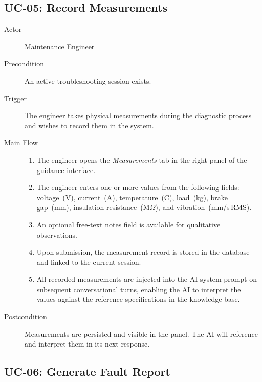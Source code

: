 \subsection{UC-05: Record Measurements\label{sec:uc05}}

\begin{description}
    \item[Actor] Maintenance Engineer
    \item[Precondition] An active troubleshooting session exists.
    \item[Trigger] The engineer takes physical measurements during the diagnostic process
                   and wishes to record them in the system.
    \item[Main Flow]
        \begin{enumerate}[noitemsep]
            \item The engineer opens the \textit{Measurements} tab in the right panel
                  of the guidance interface.
            \item The engineer enters one or more values from the following fields:
                  voltage~(V), current~(A), temperature~(\degree C), load~(kg),
                  brake gap~(mm), insulation resistance~(M\(\Omega\)), and vibration~(mm/s\,RMS).
            \item An optional free-text notes field is available for qualitative observations.
            \item Upon submission, the measurement record is stored in the database
                  and linked to the current session.
            \item All recorded measurements are injected into the AI system prompt on
                  subsequent conversational turns, enabling the AI to interpret the
                  values against the reference specifications in the knowledge base.
        \end{enumerate}
    \item[Postcondition]
        Measurements are persisted and visible in the panel. The AI will reference
        and interpret them in its next response.
\end{description}

\subsection{UC-06: Generate Fault Report\label{sec:uc06}}

